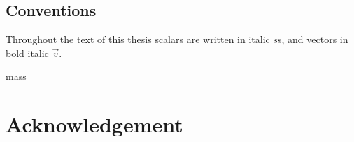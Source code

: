 \documentclass[
    a4paper,
    11pt,
    DIV=calc,
    numbers=noenddot,
    headsepline=0.04em,
    headinclude,
    BCOR=6mm,
    titlepage=firstiscover,
]{scrbook}
\begin{document}


\frontmatter

\listoftodos
\clearpage




\hypersetup{hidelinks}
\tableofcontents
\clearpage

\printglossaries



\section*{Conventions}
Throughout the text of this thesis scalars are written in italic \(s\)s, and vectors in bold italic \(\vec{v}\).
\newpage
\nonfrenchspacing

\mainmatter
\renewcommand{\thechapter}{\Roman{chapter}}

\gls{mass}



\cleardoublepage
{}
{}
\printbibliography

\backmatter


\chapter*{Acknowledgement}


%
\end{document}
